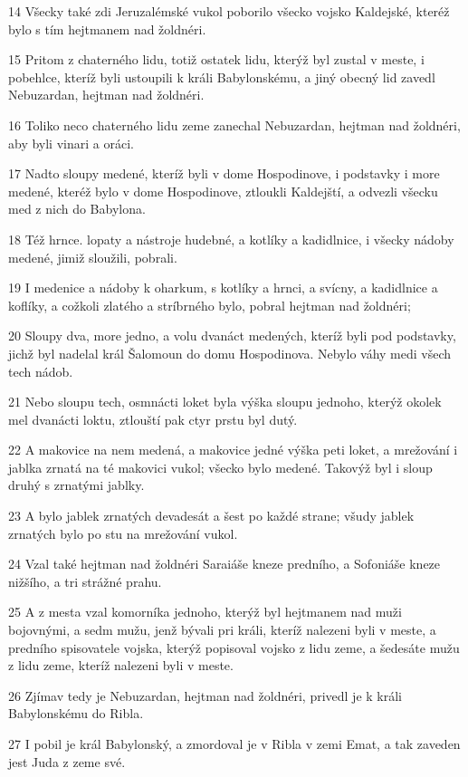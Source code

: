\par 14 Všecky také zdi Jeruzalémské vukol poborilo všecko vojsko Kaldejské, kteréž bylo s tím hejtmanem nad žoldnéri.
\par 15 Pritom z chaterného lidu, totiž ostatek lidu, kterýž byl zustal v meste, i pobehlce, kteríž byli ustoupili k králi Babylonskému, a jiný obecný lid zavedl Nebuzardan, hejtman nad žoldnéri.
\par 16 Toliko neco chaterného lidu zeme zanechal Nebuzardan, hejtman nad žoldnéri, aby byli vinari a oráci.
\par 17 Nadto sloupy medené, kteríž byli v dome Hospodinove, i podstavky i more medené, kteréž bylo v dome Hospodinove, ztloukli Kaldejští, a odvezli všecku med z nich do Babylona.
\par 18 Též hrnce. lopaty a nástroje hudebné, a kotlíky a kadidlnice, i všecky nádoby medené, jimiž sloužili, pobrali.
\par 19 I medenice a nádoby k oharkum, s kotlíky a hrnci, a svícny, a kadidlnice a koflíky, a cožkoli zlatého a stríbrného bylo, pobral hejtman nad žoldnéri;
\par 20 Sloupy dva, more jedno, a volu dvanáct medených, kteríž byli pod podstavky, jichž byl nadelal král Šalomoun do domu Hospodinova. Nebylo váhy medi všech tech nádob.
\par 21 Nebo sloupu tech, osmnácti loket byla výška sloupu jednoho, kterýž okolek mel dvanácti loktu, ztlouští pak ctyr prstu byl dutý.
\par 22 A makovice na nem medená, a makovice jedné výška peti loket, a mrežování i jablka zrnatá na té makovici vukol; všecko bylo medené. Takovýž byl i sloup druhý s zrnatými jablky.
\par 23 A bylo jablek zrnatých devadesát a šest po každé strane; všudy jablek zrnatých bylo po stu na mrežování vukol.
\par 24 Vzal také hejtman nad žoldnéri Saraiáše kneze predního, a Sofoniáše kneze nižšího, a tri strážné prahu.
\par 25 A z mesta vzal komorníka jednoho, kterýž byl hejtmanem nad muži bojovnými, a sedm mužu, jenž bývali pri králi, kteríž nalezeni byli v meste, a predního spisovatele vojska, kterýž popisoval vojsko z lidu zeme, a šedesáte mužu z lidu zeme, kteríž nalezeni byli v meste.
\par 26 Zjímav tedy je Nebuzardan, hejtman nad žoldnéri, privedl je k králi Babylonskému do Ribla.
\par 27 I pobil je král Babylonský, a zmordoval je v Ribla v zemi Emat, a tak zaveden jest Juda z zeme své.

